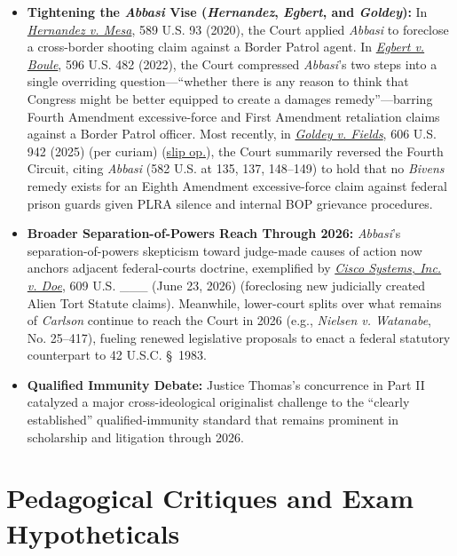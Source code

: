 \documentclass[12pt]{article}
\begin{document}
\begin{itemize}
  \item \textbf{Tightening the \textit{Abbasi} Vise (\textit{Hernandez}, \textit{Egbert}, and \textit{Goldey}):} In \href{https://supreme.justia.com/cases/federal/us/589/17-1678/}{\textit{Hernandez v. Mesa}}, 589 U.S. 93 (2020), the Court applied \textit{Abbasi} to foreclose a cross-border shooting claim against a Border Patrol agent. In \href{https://supreme.justia.com/cases/federal/us/596/21-147/}{\textit{Egbert v. Boule}}, 596 U.S. 482 (2022), the Court compressed \textit{Abbasi}'s two steps into a single overriding question---``whether there is any reason to think that Congress might be better equipped to create a damages remedy''---barring Fourth Amendment excessive-force and First Amendment retaliation claims against a Border Patrol officer. Most recently, in \href{https://supreme.justia.com/cases/federal/us/606/24-809/}{\textit{Goldey v. Fields}}, 606 U.S. 942 (2025) (per curiam) (\href{https://www.supremecourt.gov/opinions/24pdf/24-809_9o6b.pdf}{slip op.}), the Court summarily reversed the Fourth Circuit, citing \textit{Abbasi} (582 U.S. at 135, 137, 148--149) to hold that no \textit{Bivens} remedy exists for an Eighth Amendment excessive-force claim against federal prison guards given PLRA silence and internal BOP grievance procedures.
  \item \textbf{Broader Separation-of-Powers Reach Through 2026:} \textit{Abbasi}'s separation-of-powers skepticism toward judge-made causes of action now anchors adjacent federal-courts doctrine, exemplified by \href{https://www.supremecourt.gov/opinions/25pdf/24-856_kjfm.pdf}{\textit{Cisco Systems, Inc. v. Doe}}, 609 U.S. \_\_\_ (June 23, 2026) (foreclosing new judicially created Alien Tort Statute claims). Meanwhile, lower-court splits over what remains of \textit{Carlson} continue to reach the Court in 2026 (e.g., \textit{Nielsen v. Watanabe}, No. 25--417), fueling renewed legislative proposals to enact a federal statutory counterpart to 42 U.S.C. \S~1983.
  \item \textbf{Qualified Immunity Debate:} Justice Thomas's concurrence in Part II catalyzed a major cross-ideological originalist challenge to the ``clearly established'' qualified-immunity standard that remains prominent in scholarship and litigation through 2026.
\end{itemize}

\section{Pedagogical Critiques and Exam Hypotheticals}
\end{document}
